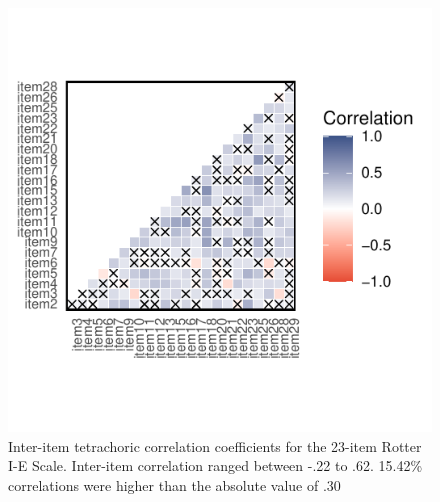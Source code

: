 \documentclass[
  man]{apa6}
\begin{document}
\begin{figure}

{\centering \includegraphics[width=1\linewidth,height=1.5\textheight]{figures/600/corplot} 

}

\caption{Inter-item tetrachoric correlation coefficients for the 23-item Rotter I-E Scale. Inter-item correlation ranged between -.22 to .62. 15.42\% correlations were higher than the absolute value of .30}\label{fig:figCor}
\end{figure}
\end{document}
